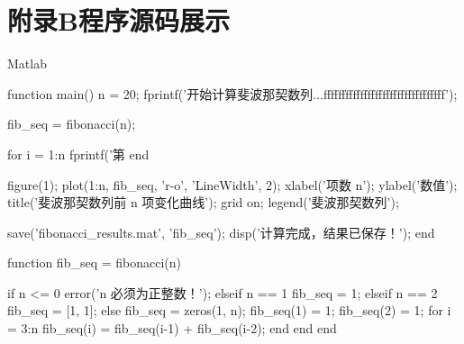 \documentclass[12pt]{article}
\begin{document}
\section*{附录B\quad 程序源码展示}
\begin{mycode}{Matlab}

function main()
    n = 20;                     %
    fprintf('开始计算斐波那契数列...fffffffffffffffffffffffffffffffff\n');
    
    fib_seq = fibonacci(n);
    
    for i = 1:n
        fprintf('第 %
    end
    
    figure(1);
    plot(1:n, fib_seq, 'r-o', 'LineWidth', 2);
    xlabel('项数 n');
    ylabel('数值');
    title('斐波那契数列前 n 项变化曲线');
    grid on;
    legend('斐波那契数列');
    
    save('fibonacci_results.mat', 'fib_seq');
    disp('计算完成，结果已保存！');
end

function fib_seq = fibonacci(n)
    
    if n <= 0
        error('n 必须为正整数！');
    elseif n == 1
        fib_seq = 1;
    elseif n == 2
        fib_seq = [1, 1];
    else
        fib_seq = zeros(1, n);
        fib_seq(1) = 1;
        fib_seq(2) = 1;
        for i = 3:n
            fib_seq(i) = fib_seq(i-1) + fib_seq(i-2);
        end
    end
end
\end{mycode}
\end{document}

